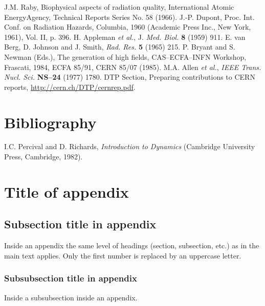 \begin{thebibliography}{99}
J.M. Raby, Biophysical aspects of radiation quality, International 
Atomic EnergyAgency, Technical Reports Series No. 58 (1966).
J.-P. Dupont, Proc. Int. Conf. on Radiation Hazards, Columbia, 
1960 (Academic Press Inc., New York, 1961), Vol. II, p. 396.
H. Appleman \emph{et al.}, J. \emph{Med. Biol.} \textbf{8} (1959) 911.
E. van Berg, D. Johnson and J. Smith, \emph{Rad. Res.} \textbf{5} (1965) 
215.
P. Bryant and S. Newman (Eds.), The generation of high fields, 
CAS--ECFA--INFN Workshop, Frascati, 1984, ECFA 85/91, CERN 85/07 
(1985).
M.A. Allen \emph{et al.}, \emph{IEEE Trans. Nucl. Sci.} \textbf{NS--24} (1977) 
1780.
DTP Section, Preparing contributions to CERN reports,
\url{http://cern.ch/DTP/cernrep.pdf}.
\end{thebibliography}

\section*{Bibliography}


I.C. Percival and D. Richards, \emph{Introduction to Dynamics}
(Cambridge University Press, Cambridge, 1982).

\appendix
\section{Title of appendix}
\label{sec:app}

\subsection{Subsection title in appendix}

Inside an appendix the same level of headings (section, subsection,
etc.) as in the main text applies. Only the first number is replaced
by an uppercase letter.

\subsubsection{Subsubsection title in appendix}

Inside a subsubsection inside an appendix.



